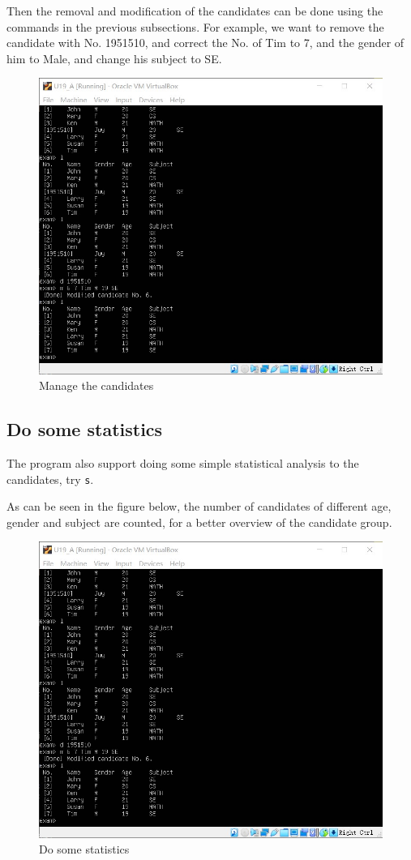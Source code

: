 \documentclass[cn,black,12pt,normal]{elegantnote}
\begin{document}
Then the removal and modification of the candidates can be done using the commands in the previous subsections. For example, we want to remove the candidate with No. 1951510, and correct the No. of Tim to 7, and the gender of him to Male, and change his subject to SE.

\begin{figure}[H]
    \centering
    \includegraphics[width=0.7\linewidth]{image/exam_04.jpg}
    \caption{Manage the candidates}
\end{figure}

\subsection{Do some statistics}

The program also support doing some simple statistical analysis to the candidates, try \lstinline{s}.

As can be seen in the figure below, the number of candidates of different age, gender and subject are counted, for a better overview of the candidate group.

\begin{figure}[H]
    \centering
    \includegraphics[width=0.7\linewidth]{image/exam_05.jpg}
    \caption{Do some statistics}
\end{figure}
\end{document}
